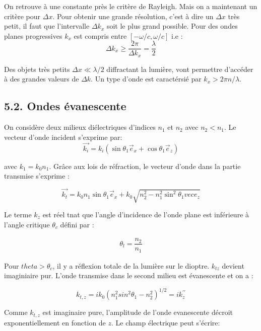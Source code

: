 \documentclass[french, a4paper, 10pt, twocolumn, landscape]{article}
\begin{document}
On retrouve à une constante près le critère de Rayleigh. Mais on a maintenant un critère pour $\Delta x$. Pour obtenir une grande résolution, c'est à dire un $\Delta x$ très petit, il faut que l'intervalle $\Delta k _x$ soit le plus grand possible. Pour des ondes planes progressives $k_x$ est compris entre $[-\omega/c, \omega/c]$ i.e :
\begin{equation}
	\Delta k_x\geq \dfrac{2\pi}{\Delta k_x}=\dfrac{\lambda}{2}
\end{equation}

Des objets très petits $\Delta x \ll \lambda/2$ diffractant la lumière, vont permettre d'accéder à des grandes valeurs de $\Delta k$. Un type d'onde est caractérsié par $k_x>2\pi n /\lambda$.

\subsection*{5.2. Ondes évanescente}

On considère deux milieux diélectriques d'indices $n_1$ et $n_2$ avec $n_2<n_1$. Le vecteur d'onde incident s'exprime par:
\begin{equation}
	\vec{k_i}=k_i\left(\sin\theta_1\vec{e}_x+\cos\theta_1\vec{e}_z\right)
\end{equation}

avec $k_1=k_0n_1$. Grâce aux lois de réfraction, le vecteur d'onde dans la partie transmise s'exprime : 

\begin{equation}
	\vec{k_t}=k_0n_1\sin\theta_1\vec{e}_x+k_0\sqrt{n_2^2-n_1^2\sin^2\theta_1vec{e}_z}
\end{equation}

Le terme $k_z$ est réel tnat que l'angle d'incidence de l'onde plane est inférieure à l'angle critique $\theta_c$ défini par : 

\begin{eqnarray}
	\theta_l=\dfrac{n_2}{n_1}
\end{eqnarray}

Pour $theta>\theta_c$, il y a réflexion totale de la lumière sur le dioptre. $k_{tz}$ devient imaginiaire pur. L'onde transmise dans le second milieu est évanescente et on a : 

\begin{equation}
	k_{t,z} = ik_0\left(n_1^2sin^2\theta_1-n_2^2\right)^{1/2}=ik_z^{\prime\prime}
\end{equation}

Comme $k_{t,z}$ est imaginaire pure, l'amplitude de l'onde evanescente décroit exponentiellement en fonction de $z$. Le champ électrique peut s'écrire: 
\end{document}
